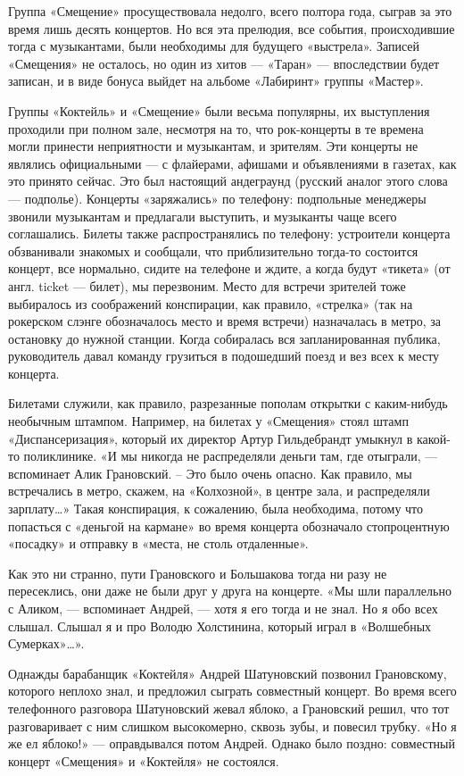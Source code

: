 \documentclass[16pt,a5paper]{book}
\begin{document}
Группа «Смещение» просуществовала недолго, всего полтора года, сыграв за это время лишь десять концертов. Но вся эта
прелюдия, все события, происходившие тогда с музыкантами, были необходимы для будущего «выстрела». Записей «Смещения» не
осталось, но один из хитов — «Таран» — впоследствии будет записан, и в виде бонуса выйдет на альбоме «Лабиринт» группы
«Мастер».

Группы «Коктейль» и «Смещение» были весьма популярны, их выступления проходили при полном зале, несмотря на то, что
рок-концерты в те времена могли принести неприятности и музыкантам, и зрителям. Эти концерты не являлись официальными —
с флайерами, афишами и объявлениями в газетах, как это принято сейчас. Это был настоящий андеграунд (русский аналог
этого слова — подполье). Концерты «заряжались» по телефону: подпольные менеджеры звонили музыкантам и предлагали
выступить, и музыканты чаще всего соглашались. Билеты также распространялись по телефону: устроители концерта
обзванивали знакомых и сообщали, что приблизительно тогда-то состоится концерт, все нормально, сидите на телефоне и
ждите, а когда будут «тикета» (от англ. ticket — билет), мы перезвоним. Место для встречи зрителей тоже выбиралось из
соображений конспирации, как правило, «стрелка» (так на рокерском слэнге обозначалось место и время встречи) назначалась
в метро, за остановку до нужной станции. Когда собиралась вся запланированная публика, руководитель давал команду
грузиться в подошедший поезд и вез всех к месту концерта.

Билетами служили, как правило, разрезанные пополам открытки с каким-нибудь необычным штампом. Например, на билетах у
«Смещения» стоял штамп «Диспансеризация», который их директор Артур Гильдебрандт умыкнул в какой-то поликлинике. «И мы
никогда не распределяли деньги там, где отыграли, — вспоминает Алик Грановский. – Это было очень опасно. Как правило, мы
встречались в метро, скажем, на «Колхозной», в центре зала, и распределяли зарплату\ldots» Такая конспирация, к
сожалению, была необходима, потому что попасться с «деньгой на кармане» во время концерта обозначало стопроцентную
«посадку» и отправку в «места, не столь отдаленные».

Как это ни странно, пути Грановского и Большакова тогда ни разу не пересеклись, они даже не были друг у друга на
концерте. «Мы шли параллельно с Аликом, — вспоминает Андрей, — хотя я его тогда и не знал. Но я обо всех слышал. Слышал
я и про Володю Холстинина, который играл в «Волшебных Сумерках»\ldots».

Однажды барабанщик «Коктейля» Андрей Шатуновский позвонил Грановскому, которого неплохо знал, и предложил сыграть
совместный концерт. Во время всего телефонного разговора Шатуновский жевал яблоко, а Грановский решил, что тот
разговаривает с ним слишком высокомерно, сквозь зубы, и повесил трубку. «Но я же ел яблоко!» — оправдывался потом
Андрей. Однако было поздно: совместный концерт «Смещения» и «Коктейля» не состоялся.
\end{document}
